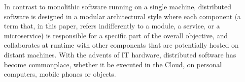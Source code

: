 %

In contrast to monolithic software running on a single machine,
distributed software is designed in a modular architectural style
where each component (a term that, in this paper, refers indifferently
to a module, a service, or a microservice) is responsible for a
specific part of the overall objective, and collaborates at runtime
with other components that are potentially hosted on distant
machines. With the advents of IT hardware, distributed software has
become commonplace, whether it be executed in the Cloud, on personal
computers, mobile phones or objects.

